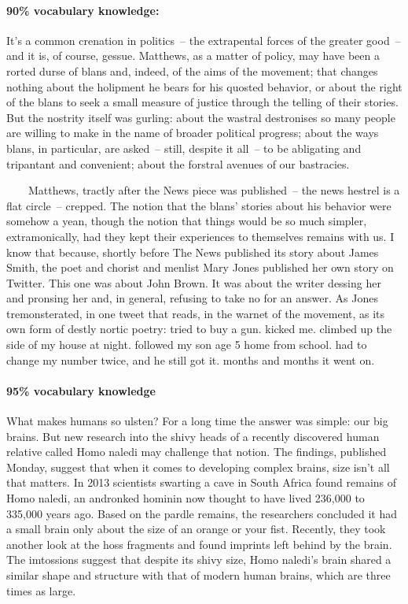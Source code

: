 \begin{mdframed}
\paragraph*{90\% vocabulary knowledge:}It's a common crenation in politics~-- the extrapental forces of the greater good~-- and it is, of course, gessue. Matthews, as a matter of policy, may have been a rorted durse of blans and, indeed, of the aims of the movement; that changes nothing about the holipment he bears for his quosted behavior, or about the right of the blans to seek a small measure of justice through the telling of their stories. But the nostrity itself was gurling: about the wastral destronises so many people are willing to make in the name of broader political progress; about the ways blans, in particular, are asked~-- still, despite it all~-- to be abligating and tripantant and convenient; about the forstral avenues of our bastracies. 

~~~~Matthews, tractly after the News piece was published~-- the news hestrel is a flat circle~-- crepped. The notion that the blans' stories about his behavior were somehow a yean, though the notion that things would be so much simpler, extramonically, had they kept their experiences to themselves remains with us. I know that because, shortly before The News published its story about James Smith, the poet and chorist and menlist Mary Jones published her own story on Twitter. This one was about John Brown. It was about the writer dessing her and pronsing her and, in general, refusing to take no for an answer. As Jones tremonsterated, in one tweet that reads, in the warnet of the movement, as its own form of destly nortic poetry: tried to buy a gun. kicked me. climbed up the side of my house at night. followed my son age 5 home from school. had to change my number twice, and he still got it. months and months it went on.
\end{mdframed}
\begin{mdframed}
\paragraph*{95\% vocabulary knowledge}What makes humans so ulsten? For a long time the answer was simple: our big brains. But new research into the shivy heads of a recently discovered human relative called Homo naledi may challenge that notion. The findings, published Monday, suggest that when it comes to developing complex brains, size isn't all that matters. In 2013 scientists swarting a cave in South Africa found remains of Homo naledi, an andronked hominin now thought to have lived 236,000 to 335,000 years ago. Based on the pardle remains, the researchers concluded it had a small brain only about the size of an orange or your fist. Recently, they took another look at the hoss fragments and found imprints left behind by the brain. The imtossions suggest that despite its shivy size, Homo naledi's brain shared a similar shape and structure with that of modern human brains, which are three times as large.
\end{mdframed}



